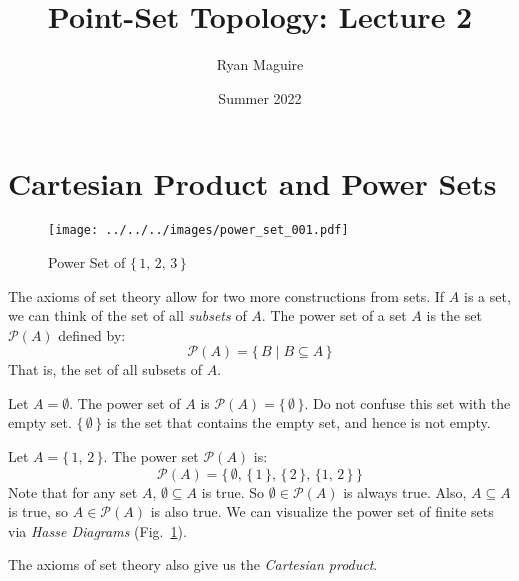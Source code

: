 \documentclass{article}
\title{Point-Set Topology: Lecture 2}
\author{Ryan Maguire}
\date{Summer 2022}
\theoremstyle{plain}
\theoremstyle{normal}
\newenvironment{example}{%
    \pushQED{\qed}\renewcommand{\qedsymbol}{$\blacksquare$}\examplex%
}{%
    \popQED\endexamplex%
}
\newenvironment{definition}{%
    \pushQED{\qed}\renewcommand{\qedsymbol}{$\blacksquare$}\definitionx%
}{%
    \popQED\enddefinitionx%
}
\begin{document}
    \maketitle
    \section{Cartesian Product and Power Sets}
        \begin{figure}
            \centering
            \texttt{[image: ../../../images/power\_set\_001.pdf]}
            \caption{Power Set of $\{\,1,\,2,\,3\,\}$}
            \label{fig:power_set_001}
        \end{figure}
        The axioms of set theory allow for two more constructions from sets.
        If $A$ is a set, we can think of the set of all \textit{subsets} of
        $A$.
        \begin{definition}[\textbf{Power Sets}]
            The power set of a set $A$ is the set $\mathcal{P}(A)$ defined by:
            \begin{equation}
                \mathcal{P}(A)=\{\,B\;|\;B\subseteq{A}\,\}
            \end{equation}
            That is, the set of all subsets of $A$.
        \end{definition}
        \begin{example}
            Let $A=\emptyset$. The power set of $A$ is
            $\mathcal{P}(A)=\{\,\emptyset\,\}$. Do not confuse this set with
            the empty set. $\{\,\emptyset\,\}$ is the set that contains the
            empty set, and hence is not empty.
        \end{example}
        \begin{example}
            Let $A=\{\,1,\,2\,\}$. The power set $\mathcal{P}(A)$ is:
            \begin{equation}
                \mathcal{P}(A)=\big\{\,\emptyset,\,\{\,1\,\},\,
                    \{\,2\,\},\,\{1,\,2\,\}\,\big\}
            \end{equation}
        \end{example}
        Note that for any set $A$, $\emptyset\subseteq{A}$ is true. So
        $\emptyset\in\mathcal{P}(A)$ is always true. Also, $A\subseteq{A}$
        is true, so $A\in\mathcal{P}(A)$ is also true. We can visualize the
        power set of finite sets via \textit{Hasse Diagrams}
        (Fig.~\ref{fig:power_set_001}).
        \par\hfill\par
        The axioms of set theory also give us the \textit{Cartesian product}.
\end{document}
